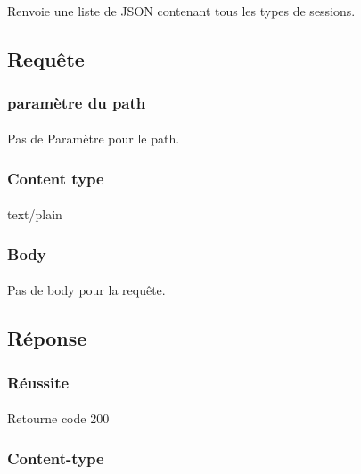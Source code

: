 \paragraph{}
	Renvoie une liste de JSON contenant tous les types de sessions.

\subsection{Requête}
	\subsubsection{paramètre du path}
		\paragraph{}
			Pas de Paramètre pour le path.
	
	\subsubsection{Content type}
		\paragraph{}
			text/plain
			
	\subsubsection{Body}
		\paragraph{}
			Pas de body pour la requête.

\vspace{\baselineskip}
\subsection{Réponse}
	\subsubsection{Réussite}
		\paragraph{}
			Retourne code 200
			
	\subsubsection{Content-type}
